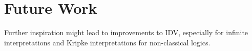 \documentclass[letterpaper]{article}
\newcommand{\smalltt}[1]{\small \texttt{#1}}
\newenvironment{packed_itemize}{
\vspace*{-0.2em}
\begin{itemize}
\setlength{\partopsep}{0pt}
\setlength{\itemsep}{1pt}
\setlength{\parskip}{0pt}
\setlength{\parsep}{0pt}
}{\end{itemize}}
\begin{document}

\section{Future Work}
\label{Future}

Further inspiration might lead to improvements to IDV, especially for infinite interpretations
and Kripke interpretations \cite{Kri63} for non-classical logics.



\end{document}
